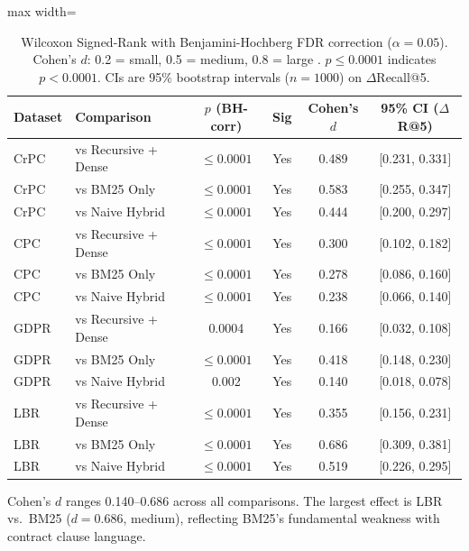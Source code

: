 \documentclass[sn-mathphys,Numbered]{sn-jnl}%
\begin{document}
\begin{table}[htbp]
\centering
\begin{adjustbox}{max width=\textwidth}
\begin{tabular}{llcccc}
\toprule
\textbf{Dataset} & \textbf{Comparison}
  & \textbf{$p$ (BH-corr)} & \textbf{Sig}
  & \textbf{Cohen's $d$} & \textbf{95\% CI ($\Delta$R@5)} \\
\midrule
CrPC & vs Recursive + Dense & $\leq 0.0001$ & Yes & 0.489 & [0.231, 0.331] \\
CrPC & vs BM25 Only         & $\leq 0.0001$ & Yes & 0.583 & [0.255, 0.347] \\
CrPC & vs Naive Hybrid      & $\leq 0.0001$ & Yes & 0.444 & [0.200, 0.297] \\
\midrule
CPC  & vs Recursive + Dense & $\leq 0.0001$ & Yes & 0.300 & [0.102, 0.182] \\
CPC  & vs BM25 Only         & $\leq 0.0001$ & Yes & 0.278 & [0.086, 0.160] \\
CPC  & vs Naive Hybrid      & $\leq 0.0001$ & Yes & 0.238 & [0.066, 0.140] \\
\midrule
GDPR & vs Recursive + Dense & 0.0004 & Yes        & 0.166 & [0.032, 0.108] \\
GDPR & vs BM25 Only         & $\leq 0.0001$ & Yes & 0.418 & [0.148, 0.230] \\
GDPR & vs Naive Hybrid      & 0.002 & Yes          & 0.140 & [0.018, 0.078] \\
\midrule
LBR  & vs Recursive + Dense & $\leq 0.0001$ & Yes & 0.355 & [0.156, 0.231] \\
LBR  & vs BM25 Only         & $\leq 0.0001$ & Yes & 0.686 & [0.309, 0.381] \\
LBR  & vs Naive Hybrid      & $\leq 0.0001$ & Yes & 0.519 & [0.226, 0.295] \\
\bottomrule
\end{tabular}
\end{adjustbox}
\caption{Wilcoxon Signed-Rank with Benjamini-Hochberg FDR correction
  ($\alpha = 0.05$).  Cohen's $d$: 0.2 = small, 0.5 = medium, 0.8 = large
  \cite{cohen1988statistical}.  $p \leq 0.0001$ indicates $p < 0.0001$.
  CIs are 95\% bootstrap intervals ($n=1000$) on $\Delta$Recall@5.}
\label{tab:significance}
\end{table}

Cohen's $d$ ranges 0.140--0.686 across all comparisons.  The largest effect
is LBR vs.\ BM25 ($d = 0.686$, medium), reflecting BM25's fundamental
weakness with contract clause language.
\end{document}
